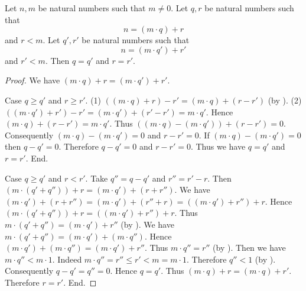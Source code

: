\documentclass{article}
\begin{document}
  \begin{forthel}
    \begin{theorem}\label{euclid_uniqueness}
      Let $n, m$ be natural numbers such that $m \neq 0$.
      Let $q, r$ be natural numbers such that
      \[n = (m \cdot q) + r\]
      and $r < m$.
      Let $q', r'$ be natural numbers such that
      \[n = (m \cdot q') + r'\]
      and $r' < m$.
      Then $q = q'$ and $r = r'$.
    \end{theorem}
    \begin{proof}
      We have $(m \cdot q) + r = (m \cdot q') + r'$.

      Case $q \geq q'$ and $r \geq r'$.
        (1) $((m \cdot q) + r) - r' = (m \cdot q) + (r - r')$ (by ).
        (2) $((m \cdot q') + r') - r'
          = (m \cdot q') + (r' - r')
          = m \cdot q'$.
        Hence $(m \cdot q) + (r - r') = m \cdot q'$.
        Thus $((m \cdot q) - (m \cdot q')) + (r - r') = 0$.
        Consequently $(m \cdot q) - (m \cdot q') = 0$ and $r - r' = 0$.
        If $(m \cdot q) - (m \cdot q') = 0$ then $q - q' = 0$.
        Therefore $q - q' = 0$ and $r - r' = 0$.
        Thus we have $q = q'$ and $r = r'$.
      End.

      Case $q \geq q'$ and $r < r'$.
        Take $q'' = q - q'$ and $r'' = r' - r$.
        Then $(m \cdot (q' + q'')) + r = (m \cdot q') + (r + r'')$.
        We have $(m \cdot q') + (r + r'')
          = (m \cdot q') + (r'' + r)
          = ((m \cdot q') + r'') + r$.
        Hence $(m \cdot (q' + q'')) + r = ((m \cdot q') + r'') + r$.
        Thus $m \cdot (q' + q'') = (m \cdot q') + r''$ (by ).
        We have $m \cdot (q' + q'') = (m \cdot q') + (m \cdot q'')$.
        Hence $(m \cdot q') + (m \cdot q'') = (m \cdot q') + r''$.
        Thus $m \cdot q'' = r''$ (by ).
        Then we have $m \cdot q'' < m \cdot 1$.
        Indeed $m \cdot q''
          = r''
          \leq r'
          < m
          = m \cdot 1$.
        Therefore $q'' < 1$ (by ).
        Consequently $q - q' = q'' = 0$.
        Hence $q = q'$.
        Thus $(m \cdot q) + r = (m \cdot q) + r'$.
        Therefore $r = r'$.
      End.


\end{proof}
\end{forthel}
\end{document}
